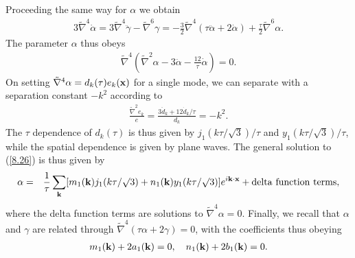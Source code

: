 \documentclass[aps,onecolumn,10pt]{revtex4}
\numberwithin{equation}{section}
\numberwithin{equation}{section}
\begin{document}
Proceeding the same way for $\alpha$  we obtain 
%
\begin{eqnarray}
3\tilde{\nabla}^4\dot{\alpha}=3\tilde{\nabla}^4\ddot{\gamma}-\tilde{\nabla}^6\gamma
=-\frac{3}{2}\tilde{\nabla}^4(\tau\ddot{\alpha}+2\dot{\alpha})+\frac{\tau}{2}\tilde{\nabla}^6\alpha.
\label{8.25}
\end{eqnarray}
%
The parameter $\alpha$ thus obeys
%
\begin{eqnarray}
\tilde{\nabla}^4\left(\tilde{\nabla}^2\alpha-3\ddot{\alpha}-\frac{12}{\tau}\dot{\alpha}\right)=0.
\label{8.26}
\end{eqnarray}
%
On setting $\tilde{\nabla}^4\alpha=d_k(\tau)e_k({\bf x})$ for a single mode, we can separate with a separation constant $-k^2$ according to
%
\begin{eqnarray}
\frac{\tilde{\nabla}^2e_k}{e}=\frac{3\ddot{d}_k+12\dot{d}_k/\tau}{d_k}=-k^2.
\label{8.27}
\end{eqnarray}
%
The $\tau$ dependence of $d_k(\tau)$ is thus given by $j_1(k\tau/\surd{3})/\tau$ and  $y_1(k\tau/\surd{3})/\tau$, while the spatial dependence is given by plane waves. The general solution to (\ref{8.26}) is thus given by 
%
\begin{eqnarray}
\alpha&=&\frac{1}{\tau}\sum_{\bf k}[m_1({\bf k})j_1(k\tau/\surd{3})+n_1({\bf k})y_1(k\tau/\surd{3})]e^{i{\bf k}\cdot{\bf x}} +{\rm delta~function~terms},
\label{8.28}
\end{eqnarray}
%
where the delta function terms are solutions to $\tilde{\nabla}^4\alpha=0$. Finally, we recall that $\alpha$ and $\gamma$ are related through $\tilde{\nabla}^4(\tau\alpha+2\gamma)=0$,  with the coefficients  thus obeying
%
\begin{eqnarray}
 m_1({\bf k})+2a_1({\bf k})=0,\quad n_1({\bf k})+2b_1({\bf k})=0.
\label{8.29}
\end{eqnarray}
%
\end{document}
